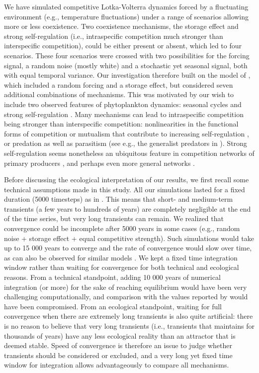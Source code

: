 \documentclass[a4paper,12pt]{article}
\begin{document}
We have simulated competitive Lotka-Volterra dynamics forced by a
fluctuating environment (e.g., temperature fluctuations) under a range
of scenarios allowing more or less coexistence. Two coexistence mechanisms,
the storage effect and strong self-regulation (i.e., intraspecific
competition much stronger than interspecific competition), could be
either present or absent, which led to four scenarios. These four
scenarios were crossed with two possibilities for the forcing signal,
a random noise (mostly white) and a stochastic yet seasonal signal,
both with equal temporal variance. Our investigation therefore built
on the model of \citet{scranton_coexistence_2016}, which included
a random forcing and a storage effect, but considered seven additional
combinations of mechanisms. This was motivated by our wish to include
two observed features of phytoplankton dynamics: seasonal cycles \citep{winder_annual_2010}
and strong self-regulation \citep{chesson_mechanisms_2000,adler_coexistence_2010,barraquand2018coastal}.
Many mechanisms can lead to intraspecific competition being stronger
than interspecific competition: nonlinearities in the functional forms
of competition or mutualism that contribute to increasing self-regulation
\citep{kawatsu2018density}, or predation as well as parasitism (see
e.g., the generalist predators in \citealp{haydon1994pivotal}). Strong
self-regulation seems nonetheless an ubiquitous feature in competition
networks of primary producers \citep{adler_competition_2018}, and
perhaps even more general networks \citep{barabas_self-regulation_2017}.

Before discussing the ecological interpretation of our results, we
first recall some technical assumptions made in this study. All our
simulations lasted for a fixed duration (5000 timesteps) as in \citet{scranton_coexistence_2016}.
This means that short- and medium-term transients (a few years to
hundreds of years) are completely negligible at the end of the time
series, but very long transients can remain. We realized that convergence
could be incomplete after 5000 years in some cases (e.g., random noise
+ storage effect + equal competitive strength). Such simulations would
take up to 15 000 years to converge and the rate of convergence would
slow over time, as can also be observed for similar models \citep{scheffer_self-organized_2006}.
We kept a fixed time integration window rather than waiting for convergence
for both technical and ecological reasons. From a technical standpoint,
adding 10 000 years of numerical integration (or more) for the sake
of reaching equilibrium would have been very challenging computationally,
and comparison with the values reported by \citet{scranton_coexistence_2016}
would have been compromised. From an ecological standpoint, waiting
for full convergence when there are extremely long transients \citep{hastings_transient_2018}
is also quite artificial: there is no reason to believe that very
long transients (i.e., transients that maintains for thousands of
years) have any less ecological reality than an attractor that is
deemed stable. Speed of convergence is therefore an issue to judge
whether transients should be considered or excluded, and a very long
yet fixed time window for integration allows advantageously to compare
all mechanisms. 
\end{document}
